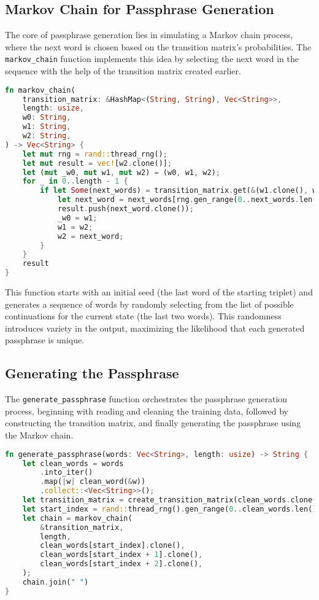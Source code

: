 \documentclass[a4paper,12pt]{article}
\begin{document}
\subsection{Markov Chain for Passphrase Generation}
The core of passphrase generation lies in simulating a Markov chain process, where the next word is chosen based on the transition matrix's probabilities. The \texttt{markov\_chain} function implements this idea by selecting the next word in the sequence with the help of the transition matrix created earlier.

\begin{lstlisting}[language=Rust, caption={Markov Chain Function}]
fn markov_chain(
    transition_matrix: &HashMap<(String, String), Vec<String>>,
    length: usize,
    w0: String,
    w1: String,
    w2: String,
) -> Vec<String> {
    let mut rng = rand::thread_rng();
    let mut result = vec![w2.clone()];
    let (mut _w0, mut w1, mut w2) = (w0, w1, w2);
    for _ in 0..length - 1 {
        if let Some(next_words) = transition_matrix.get(&(w1.clone(), w2.clone())) {
            let next_word = next_words[rng.gen_range(0..next_words.len())].clone();
            result.push(next_word.clone());
            _w0 = w1;
            w1 = w2;
            w2 = next_word;
        }
    }
    result
}
\end{lstlisting}

This function starts with an initial seed (the last word of the starting triplet) and generates a sequence of words by randomly selecting from the list of possible continuations for the current state (the last two words). This randomness introduces variety in the output, maximizing the likelihood that each generated passphrase is unique.

\subsection{Generating the Passphrase}
The \texttt{generate\_passphrase} function orchestrates the passphrase generation process, beginning with reading and cleaning the training data, followed by constructing the transition matrix, and finally generating the passphrase using the Markov chain.

\begin{lstlisting}[language=Rust, caption={Generating the Passphrase}]
fn generate_passphrase(words: Vec<String>, length: usize) -> String {
    let clean_words = words
        .into_iter()
        .map(|w| clean_word(&w))
        .collect::<Vec<String>>();
    let transition_matrix = create_transition_matrix(clean_words.clone());
    let start_index = rand::thread_rng().gen_range(0..clean_words.len() - 3);
    let chain = markov_chain(
        &transition_matrix,
        length,
        clean_words[start_index].clone(),
        clean_words[start_index + 1].clone(),
        clean_words[start_index + 2].clone(),
    );
    chain.join(" ")
}
\end{lstlisting}
\end{document}
